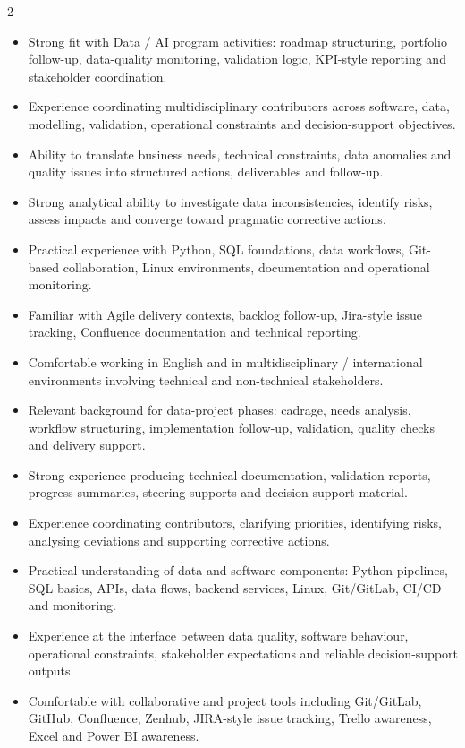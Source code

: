 \documentclass[8pt,a4paper,ragged2e,withhyper]{altacv}
\begin{document}
\begin{paracol}{2}
\begin{itemize}
  \item Strong fit with Data / AI program activities: roadmap structuring, portfolio follow-up, data-quality monitoring, validation logic, KPI-style reporting and stakeholder coordination.
  \item Experience coordinating multidisciplinary contributors across software, data, modelling, validation, operational constraints and decision-support objectives.
  \item Ability to translate business needs, technical constraints, data anomalies and quality issues into structured actions, deliverables and follow-up.
  \item Strong analytical ability to investigate data inconsistencies, identify risks, assess impacts and converge toward pragmatic corrective actions.
  \item Practical experience with Python, SQL foundations, data workflows, Git-based collaboration, Linux environments, documentation and operational monitoring.
  \item Familiar with Agile delivery contexts, backlog follow-up, Jira-style issue tracking, Confluence documentation and technical reporting.
  \item Comfortable working in English and in multidisciplinary / international environments involving technical and non-technical stakeholders.
\end{itemize}


\begin{itemize}
  \item Relevant background for data-project phases: cadrage, needs analysis, workflow structuring, implementation follow-up, validation, quality checks and delivery support.
  \item Strong experience producing technical documentation, validation reports, progress summaries, steering supports and decision-support material.
  \item Experience coordinating contributors, clarifying priorities, identifying risks, analysing deviations and supporting corrective actions.
  \item Practical understanding of data and software components: Python pipelines, SQL basics, APIs, data flows, backend services, Linux, Git/GitLab, CI/CD and monitoring.
  \item Experience at the interface between data quality, software behaviour, operational constraints, stakeholder expectations and reliable decision-support outputs.
  \item Comfortable with collaborative and project tools including Git/GitLab, GitHub, Confluence, Zenhub, JIRA-style issue tracking, Trello awareness, Excel and Power BI awareness.
\end{itemize}


\end{paracol}
\end{document}
